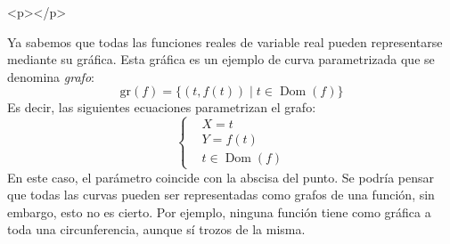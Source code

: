 \begin{rawhtml}
<p></p>
\end{rawhtml}
\begin{ejemplo}
Ya sabemos que todas las funciones reales de variable real pueden representarse mediante su gráfica. Esta gráfica es un ejemplo de curva parametrizada que se denomina \emph{grafo}:
\[
\mathrm{gr}(f)=\{(t,f(t))\mid t\in \operatorname{Dom}(f)\}
\]
Es decir, las siguientes ecuaciones parametrizan el grafo:
\[
\begin{cases}
& X = t\\
& Y = f(t)\\
& t\in \operatorname{Dom}(f)
\end{cases}
\]
En este caso, el parámetro coincide con la abscisa del punto.
Se podría pensar que todas las curvas pueden ser representadas como grafos de una función, sin embargo, esto no es cierto.
Por ejemplo, ninguna función tiene como gráfica a toda una circunferencia, aunque sí trozos de la misma.\fej
\end{ejemplo}

